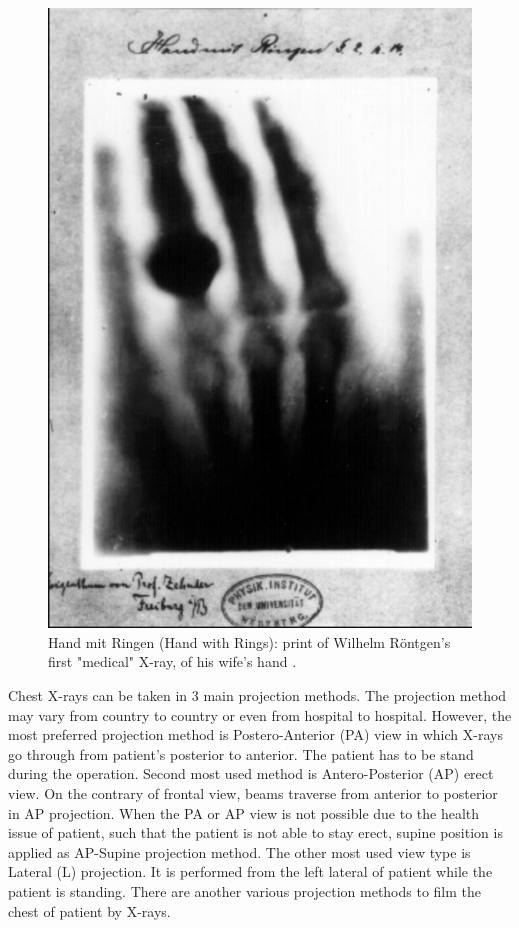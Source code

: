 \begin{figure}[h]
    \centering
    \includegraphics[keepaspectratio=true, scale=0.5]{./fig/first_medical_xray}
    \vspace*{3mm}
    \caption{Hand mit Ringen (Hand with Rings): print of Wilhelm Röntgen's first "medical" X-ray, of his wife's hand \cite{HandMitRingen}.}
    \label{fig:first_medical_xray}
\end{figure}

Chest X-rays can be taken in 3 main projection methods. The projection method may vary from country to country or even from hospital to hospital. However, the most preferred projection method is Postero-Anterior (PA) view in which X-rays go through from patient's posterior to anterior. The patient has to be stand during the operation. Second most used method is Antero-Posterior (AP) erect view. On the contrary of frontal view, beams traverse from anterior to posterior in AP projection.
When the PA or AP view is not possible due to the health issue of patient, such that the patient is not able to stay erect, supine position is applied as AP-Supine projection method. The other most used view type is Lateral (L) projection. It is performed from the left lateral of patient while the patient is standing. There are another various projection methods to film the chest of patient by X-rays.

